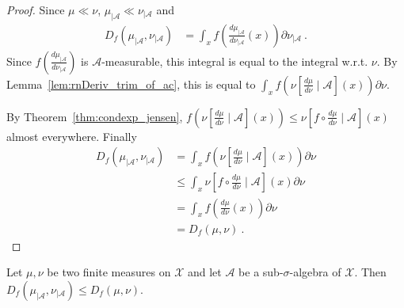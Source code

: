 \begin{proof}\leanok
{}
Since $\mu \ll \nu$, $\mu_{| \mathcal A} \ll \nu_{| \mathcal A}$ and
\begin{align*}
D_f(\mu_{| \mathcal A}, \nu_{| \mathcal A})
&= \int_x f \left( \frac{d \mu_{| \mathcal A}}{d \nu_{| \mathcal A}}(x) \right) \partial\nu_{| \mathcal A} \: .
\end{align*}
Since $f \left( \frac{d \mu_{| \mathcal A}}{d \nu_{| \mathcal A}} \right)$ is $\mathcal A$-measurable, this integral is equal to the integral w.r.t. $\nu$.
By Lemma~\ref{lem:rnDeriv_trim_of_ac}, this is equal to $\int_x f \left( \nu\left[ \frac{d \mu}{d \nu} \mid \mathcal A\right] (x) \right) \partial\nu$.

By Theorem~\ref{thm:condexp_jensen}, $f \left( \nu\left[ \frac{d \mu}{d \nu} \mid \mathcal A\right] (x) \right) \le \nu\left[ f \circ \frac{d \mu}{d \nu} \mid \mathcal A\right] (x)$ almost everywhere.
Finally
\begin{align*}
D_f(\mu_{| \mathcal A}, \nu_{| \mathcal A})
&= \int_x f \left( \nu\left[ \frac{d \mu}{d \nu} \mid \mathcal A\right] (x) \right) \partial\nu
\\
&\le \int_x \nu\left[ f \circ \frac{d \mu}{d \nu} \mid \mathcal A\right] (x) \partial\nu
\\
&= \int_x f \left( \frac{d \mu}{d \nu} (x) \right) \partial\nu
\\
&= D_f(\mu, \nu)
\: .
\end{align*}

\end{proof}

\begin{theorem}
  \label{thm:fDiv_trim_le}
  \leanok
  Let $\mu, \nu$ be two finite measures on $\mathcal X$ and let $\mathcal A$ be a sub-$\sigma$-algebra of $\mathcal X$. Then
  $D_f(\mu_{| \mathcal A}, \nu_{| \mathcal A}) \le D_f(\mu, \nu)$.
\end{theorem}

